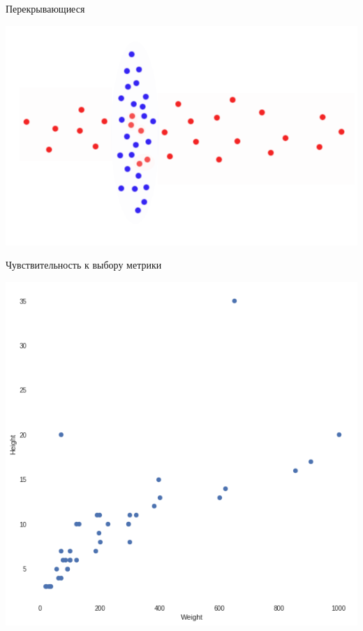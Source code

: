 \documentclass[10pt]{beamer}
\begin{document}
\begin{frame}{Перекрывающиеся}
	\begin{center}
	  \includegraphics[height=0.6 \textheight, keepaspectratio = true]{images/cluster6}  
	\end{center}
\end{frame}

\begin{frame}{Чувствительность к выбору метрики}
	\begin{center}
	  \includegraphics[height=0.8 \textheight, keepaspectratio = true]{images/weight_height1}  
	\end{center}
\end{frame}
\end{document}
